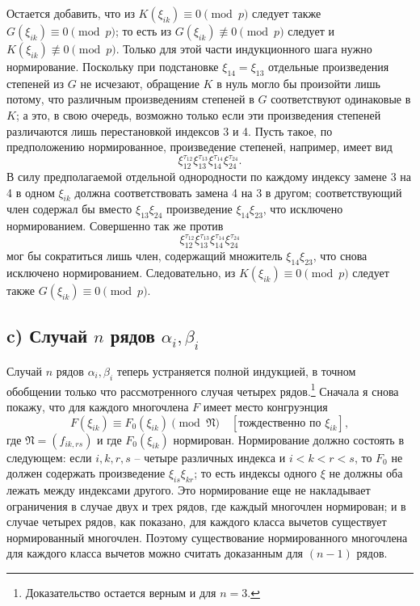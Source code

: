 \documentclass[11pt]{article}
\providecommand{\frN}{\mathfrak N}
\begin{document}
Остается добавить, что из \(K(\xi_{ik})\equiv0\pmod p\) следует также \(G(\xi_{ik})\equiv0\pmod p\); то есть из \(G(\xi_{ik})\not\equiv0\pmod p\) следует и \(K(\xi_{ik})\not\equiv0\pmod p\). Только для этой части индукционного шага нужно нормирование. Поскольку при подстановке \(\xi_{14}=\xi_{13}\) отдельные произведения степеней из \(G\) не исчезают, обращение \(K\) в нуль могло бы произойти лишь потому, что различным произведениям степеней в \(G\) соответствуют одинаковые в \(K\); а это, в свою очередь, возможно только если эти произведения степеней различаются лишь перестановкой индексов 3 и 4. Пусть такое, по предположению нормированное, произведение степеней, например, имеет вид
\[
        \xi_{12}^{\tau_{12}}\xi_{13}^{\tau_{13}}\xi_{14}^{\tau_{14}}\xi_{24}^{\tau_{24}}.
\]
В силу предполагаемой отдельной однородности по каждому индексу замене 3 на 4 в одном \(\xi_{ik}\) должна соответствовать замена 4 на 3 в другом; соответствующий член содержал бы вместо \(\xi_{13}\xi_{24}\) произведение \(\xi_{14}\xi_{23}\), что исключено нормированием. Совершенно так же против
\[
        \xi_{12}^{\tau_{12}}\xi_{13}^{\tau_{13}}\xi_{14}^{\tau_{14}}\xi_{24}^{\tau_{24}}
\]
мог бы сократиться лишь член, содержащий множитель \(\xi_{14}\xi_{23}\), что снова исключено нормированием. Следовательно, из \(K(\xi_{ik})\equiv0\pmod p\) следует также \(G(\xi_{ik})\equiv0\pmod p\).

\subsection*{c) Случай \(n\) рядов \(\alpha_i,\beta_i\)}

Случай \(n\) рядов \(\alpha_i,\beta_i\) теперь устраняется полной индукцией, в точном обобщении только что рассмотренного случая четырех рядов.\footnote{Доказательство остается верным и для \(n=3\).}
Сначала я снова покажу, что для каждого многочлена \(F\) имеет место конгруэнция
\begin{equation}
        F(\xi_{ik})\equiv F_0(\xi_{ik})\pmod{\frN}\quad [\text{тождественно по \(\xi_{ik}\)}],
\end{equation}
где \(\frN=(f_{ik,rs})\) и где \(F_0(\xi_{ik})\) нормирован. Нормирование должно состоять в следующем: если \(i,k,r,s\) -- четыре различных индекса и \(i<k<r<s\), то \(F_0\) не должен содержать произведение \(\xi_{is}\xi_{kr}\); то есть индексы одного \(\xi\) не должны оба лежать между индексами другого. Это нормирование еще не накладывает ограничения в случае двух и трех рядов, где каждый многочлен нормирован; и в случае четырех рядов, как показано, для каждого класса вычетов существует нормированный многочлен. Поэтому существование нормированного многочлена для каждого класса вычетов можно считать доказанным для \((n-1)\) рядов.
\end{document}
